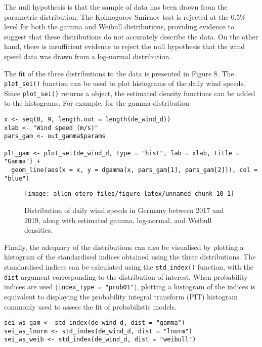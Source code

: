 The null hypothesis is that the sample of data has been drawn from the parametric distribution. The Kolmogorov-Smirnov test is rejected at the 0.5\% level for both the gamma and Weibull distributions, providing evidence to suggest that these distributions do not accurately describe the data. On the other hand, there is insufficient evidence to reject the null hypothesis that the wind speed data was drawn from a log-normal distribution.

The fit of the three distributions to the data is presented in Figure 8. The \texttt{plot\_sei()} function can be used to plot histograms of the daily wind speeds. Since \texttt{plot\_sei()} returns a  object, the estimated density functions can be added to the histograms. For example, for the gamma distribution

\begin{verbatim}
x <- seq(0, 9, length.out = length(de_wind_d))
xlab <- "Wind speed (m/s)"
pars_gam <- out_gamma$params

plt_gam <- plot_sei(de_wind_d, type = "hist", lab = xlab, title = "Gamma") +
  geom_line(aes(x = x, y = dgamma(x, pars_gam[1], pars_gam[2])), col = "blue")
\end{verbatim}

\begin{figure}

{\centering \texttt{[image: allen-otero\_files/figure-latex/unnamed-chunk-10-1]} 

}

\caption{Distribution of daily wind speeds in Germany between 2017 and 2019, along with estimated gamma, log-normal, and Weibull densities.}\label{fig:unnamed-chunk-10}
\end{figure}

Finally, the adequacy of the distributions can also be visualised by plotting a histogram of the standardised indices obtained using the three distributions. The standardised indices can be calculated using the \texttt{std\_index()} function, with the \texttt{dist} argument corresponding to the distribution of interest. When probability indices are used (\texttt{index\_type\ =\ "prob01"}), plotting a histogram of the indices is equivalent to displaying the probability integral transform (PIT) histogram commonly used to assess the fit of probabilistic models.

\begin{verbatim}
sei_ws_gam <- std_index(de_wind_d, dist = "gamma")
sei_ws_lnorm <- std_index(de_wind_d, dist = "lnorm")
sei_ws_weib <- std_index(de_wind_d, dist = "weibull")
\end{verbatim}

